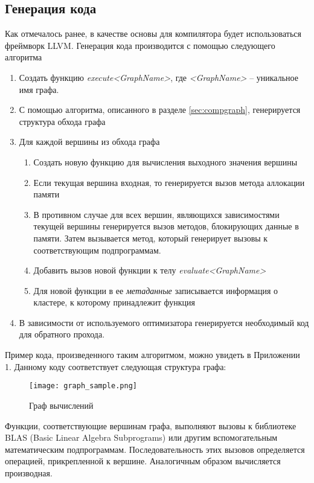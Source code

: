 \subsection{Генерация кода}
Как отмечалось ранее, в качестве основы для компилятора будет использоваться
фреймворк LLVM. Генерация кода производится с помощью следующего алгоритма
\begin{enumerate}
    \item Создать функцию \textit{execute<GraphName>}, где \textit{<GraphName>} -- уникальное имя графа.
    \item С помощью алгоритма, описанного в разделе \ref{sec:compgraph},
        генерируется структура обхода графа
    \item Для каждой вершины из обхода графа
        \begin{enumerate}
            \item Создать новую функцию для вычисления выходного значения
                вершины
            \item Если текущая вершина входная, то генерируется вызов метода
                аллокации памяти
            \item В противном случае для всех вершин, являющихся зависимостями
                текущей вершины генерируется вызов методов, блокирующих
                данные в памяти. Затем вызывается метод, который генерирует
                вызовы к соответствующим подпрограммам.
            \item Добавить вызов новой функции к телу \textit{evaluate<GraphName>}
            \item Для новой функции в ее \textit{метаданные} записывается
                информация о кластере, к которому принадлежит функция
        \end{enumerate}
    \item В зависимости от используемого оптимизатора генерируется необходимый
        код для обратного прохода.
\end{enumerate}

Пример кода, произведенного таким алгоритмом, можно увидеть в Приложении 1.
Данному коду соответствует следующая структура графа:

\begin{figure}[ht]
    \centering
    \texttt{[image: graph\_sample.png]}
    \caption{Граф вычислений}
    \label{fig:graphsample}
\end{figure}


Функции, соответствующие вершинам графа, выполняют вызовы к библиотеке BLAS
(Basic Linear Algebra Subprograms) или другим вспомогательным математическим
подпрограммам. Последовательность этих вызовов определяется операцией, прикрепленной
к вершине. Аналогичным образом вычисляется производная.

